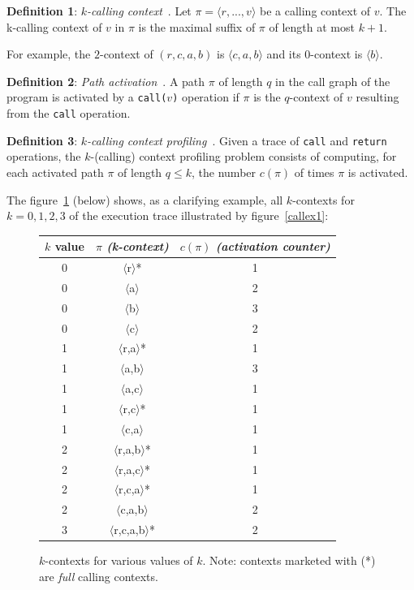 \documentclass[a4paper,10pt]{report}
\begin{document}
\textbf{Definition 1}: \emph{$k$-calling context}~\cite{kccf}. 
Let $\pi = \langle r,...,v\rangle$ be a calling context of $v$. The k-calling context of $v$
in $\pi$ is the maximal suffix of $\pi$ of length at most $k+1$.

For example, the $2$-context of $(r,c,a,b)$ is $\langle c,a,b\rangle$ and its $0$-context is $\langle b\rangle$.

\textbf{Definition 2}: \emph{Path activation}~\cite{kccf}. 
A path $\pi$ of length $q$ in the call graph of the program is activated by 
a \texttt{call(}$v$\texttt{)}
operation if $\pi$ is the $q$-context of $v$ resulting from the \texttt{call} operation.

\textbf{Definition 3}: \emph{$k$-calling context profiling}~\cite{kccf}. Given a trace
of \texttt{call} and \texttt{return} operations, the $k$-(calling) context
profiling problem consists of computing, for each activated path $\pi$ of length $q\le k$, the number $c(\pi)$ of times $\pi$ is activated.

The figure~\ref{kctx1} (below) shows, as a clarifying example, all $k$-contexts for $k=0,1,2,3$ of the execution trace illustrated by figure~\ref{callex1}:

\begin{figure}[h]
\begin{center}
\begin{tabular}{c|c|c}
$k$ value & \textbf{$\pi$} \emph{(k-context)} & $c(\pi)$ \emph{(activation counter)}\\
\hline
0 & $\langle$r$\rangle$* & 1\\
0 & $\langle$a$\rangle$ & 2\\
0 & $\langle$b$\rangle$ & 3\\
0 & $\langle$c$\rangle$ & 2\\
\hline
1 & $\langle$r,a$\rangle$* & 1\\
1 & $\langle$a,b$\rangle$ & 3\\
1 & $\langle$a,c$\rangle$ & 1\\
1 & $\langle$r,c$\rangle$* & 1\\
1 & $\langle$c,a$\rangle$ & 1\\
\hline
2 & $\langle$r,a,b$\rangle$* & 1\\
2 & $\langle$r,a,c$\rangle$* & 1\\
2 & $\langle$r,c,a$\rangle$* & 1\\
2 & $\langle$c,a,b$\rangle$ & 2\\
\hline
3 & $\langle$r,c,a,b$\rangle$* & 2\\

\end{tabular}
\end{center}
\caption{$k$-contexts for various values of $k$.
Note: contexts marketed with (*) are \emph{full} calling contexts.}
\label{kctx1}
\end{figure}
\end{document}
